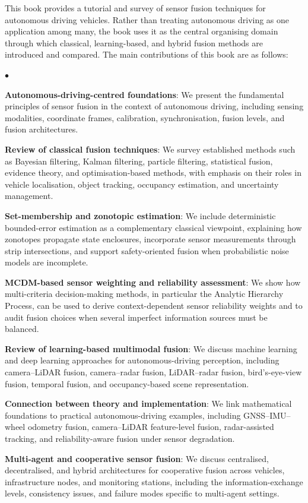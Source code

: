 \documentclass[11pt,oneside,openany]{book}
\newenvironment{list4a}{
  \begin{list}{$\bullet$}{%
      \setlength{\itemsep}{0.05cm}
      \setlength{\labelsep}{0.2cm}
      \setlength{\labelwidth}{0.3cm}
      \setlength{\parsep}{0in}
      \setlength{\parskip}{0in}
      \setlength{\topsep}{0in}
      \setlength{\partopsep}{0in}
      \setlength{\leftmargin}{0.16in}}}
      {\end{list}}
\begin{document}
This book provides a tutorial and survey of sensor fusion techniques for autonomous driving vehicles. Rather than treating autonomous driving as one application among many, the book uses it as the central organising domain through which classical, learning-based, and hybrid fusion methods are introduced and compared. The main contributions of this book are as follows:
\begin{list4a}
    \item \textbf{Autonomous-driving-centred foundations}: We present the fundamental principles of sensor fusion in the context of autonomous driving, including sensing modalities, coordinate frames, calibration, synchronisation, fusion levels, and fusion architectures.
    \item \textbf{Review of classical fusion techniques}: We survey established methods such as Bayesian filtering, Kalman filtering, particle filtering, statistical fusion, evidence theory, and optimisation-based methods, with emphasis on their roles in vehicle localisation, object tracking, occupancy estimation, and uncertainty management.
    \item \textbf{Set-membership and zonotopic estimation}: We include deterministic bounded-error estimation as a complementary classical viewpoint, explaining how zonotopes propagate state enclosures, incorporate sensor measurements through strip intersections, and support safety-oriented fusion when probabilistic noise models are incomplete.
    \item \textbf{MCDM-based sensor weighting and reliability assessment}: We show how multi-criteria decision-making methods, in particular the Analytic Hierarchy Process, can be used to derive context-dependent sensor reliability weights and to audit fusion choices when several imperfect information sources must be balanced.
    \item \textbf{Review of learning-based multimodal fusion}: We discuss machine learning and deep learning approaches for autonomous-driving perception, including camera--LiDAR fusion, camera--radar fusion, LiDAR--radar fusion, bird's-eye-view fusion, temporal fusion, and occupancy-based scene representation.
    \item \textbf{Connection between theory and implementation}: We link mathematical foundations to practical autonomous-driving examples, including GNSS--IMU--wheel odometry fusion, camera--LiDAR feature-level fusion, radar-assisted tracking, and reliability-aware fusion under sensor degradation.
    \item \textbf{Multi-agent and cooperative sensor fusion}: We discuss centralised, decentralised, and hybrid architectures for cooperative fusion across vehicles, infrastructure nodes, and monitoring stations, including the information-exchange levels, consistency issues, and failure modes specific to multi-agent settings.

\end{list4a}
\end{document}
